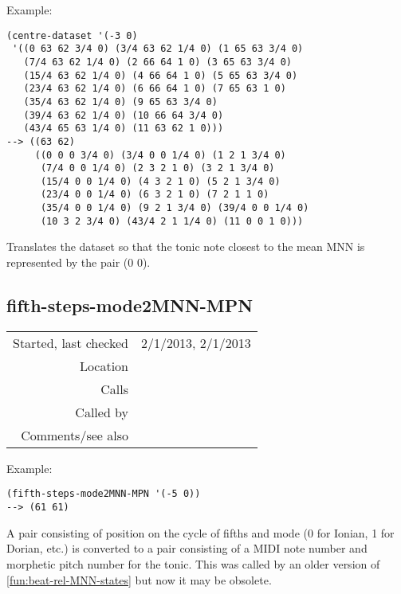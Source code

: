 \vspace{0.5cm}
\noindent Example:
\begin{verbatim}
(centre-dataset '(-3 0)
 '((0 63 62 3/4 0) (3/4 63 62 1/4 0) (1 65 63 3/4 0)
   (7/4 63 62 1/4 0) (2 66 64 1 0) (3 65 63 3/4 0)
   (15/4 63 62 1/4 0) (4 66 64 1 0) (5 65 63 3/4 0)
   (23/4 63 62 1/4 0) (6 66 64 1 0) (7 65 63 1 0)
   (35/4 63 62 1/4 0) (9 65 63 3/4 0)
   (39/4 63 62 1/4 0) (10 66 64 3/4 0)
   (43/4 65 63 1/4 0) (11 63 62 1 0)))
--> ((63 62)
     ((0 0 0 3/4 0) (3/4 0 0 1/4 0) (1 2 1 3/4 0)
      (7/4 0 0 1/4 0) (2 3 2 1 0) (3 2 1 3/4 0)
      (15/4 0 0 1/4 0) (4 3 2 1 0) (5 2 1 3/4 0)
      (23/4 0 0 1/4 0) (6 3 2 1 0) (7 2 1 1 0)
      (35/4 0 0 1/4 0) (9 2 1 3/4 0) (39/4 0 0 1/4 0)
      (10 3 2 3/4 0) (43/4 2 1 1/4 0) (11 0 0 1 0)))
\end{verbatim}

\noindent Translates the dataset so that the tonic
note closest to the mean MNN is represented by the
pair (0 0).


\subsection*{fifth-steps-mode2MNN-MPN}\label{fun:fifth-steps-mode2MNN-MPN}

\vspace{0.3cm}
\begin{tabular}{r|p{8cm}}
Started, last checked & 2/1/2013, 2/1/2013 \\
Location & \nameref{sec:beat-rel-MNN-states} \\
Calls & \\
Called by & \nameref{fun:centre-dataset} \\
Comments/see also &
\end{tabular}

\vspace{0.5cm}
\noindent Example:
\begin{verbatim}
(fifth-steps-mode2MNN-MPN '(-5 0))
--> (61 61)
\end{verbatim}

\noindent A pair consisting of position on the cycle
of fifths and mode (0 for Ionian, 1 for Dorian, etc.)
is converted to a pair consisting of a MIDI note
number and morphetic pitch number for the tonic. This
was called by an older version of
\ref{fun:beat-rel-MNN-states} but now it may be
obsolete.









